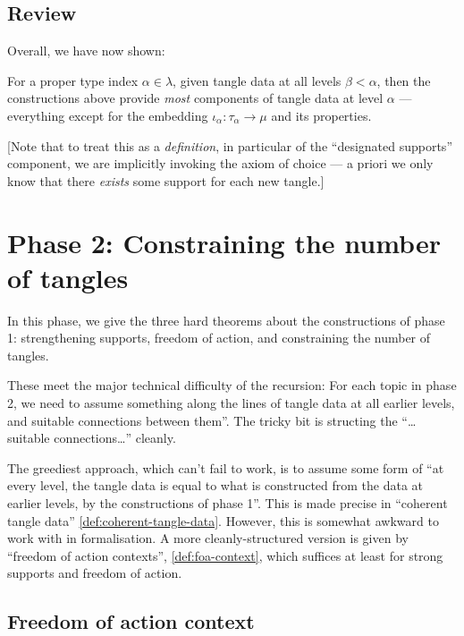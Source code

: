 \section{Review}

Overall, we have now shown:

\begin{definition}
  \label{def:tangle-data-propagates}
  For a proper type index $\alpha \in \lambda$, given tangle data at all levels $\beta < \alpha$, then the constructions above provide \emph{most} components of tangle data at level $\alpha$ — everything except for the embedding $\iota_\alpha : \tau_\alpha \to \mu$ and its properties.

  [Note that to treat this as a \emph{definition}, in particular of the “designated supports” component, we are implicitly invoking the axiom of choice --- a priori we only know that there \emph{exists} some support for each new tangle.]
\end{definition}

\newpage

\chapter{Phase 2: Constraining the number of tangles}

In this phase, we give the three hard theorems about the constructions of phase 1: strengthening supports, freedom of action, and constraining the number of tangles.

These meet the major technical difficulty of the recursion: For each topic in phase 2, we need to assume something along the lines of tangle data at all earlier levels, and suitable connections between them”.  The tricky bit is structing the “…suitable connections…” cleanly.

The greediest approach, which can’t fail to work, is to assume some form of “at every level, the tangle data is equal to what is constructed from the data at earlier levels, by the constructions of phase 1”.  This is made precise in “coherent tangle data” \cref{def:coherent-tangle-data}.  However, this is somewhat awkward to work with in formalisation.  A more cleanly-structured version is given by “freedom of action contexts”, \cref{def:foa-context}, which suffices at least for strong supports and freedom of action.

\section{Freedom of action context}

